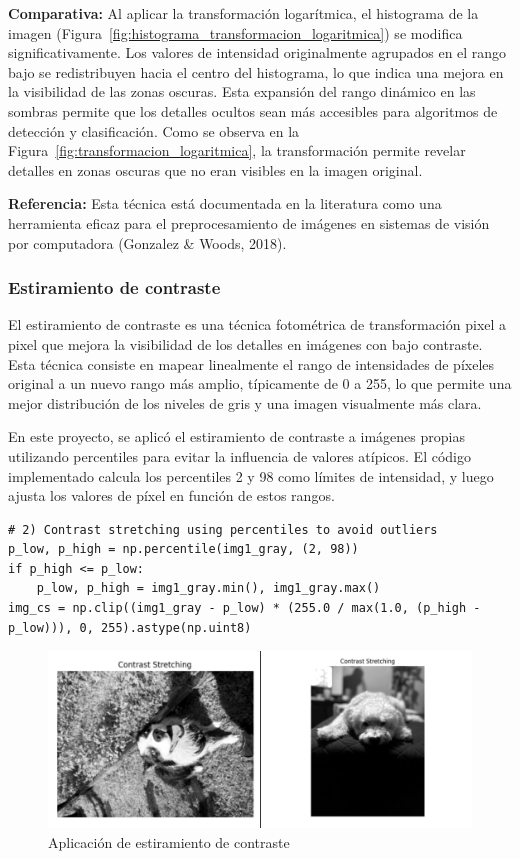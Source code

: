\documentclass[12pt,letterpaper]{article}
\begin{document}
\textbf{Comparativa:} Al aplicar la transformación logarítmica, el histograma de la imagen (Figura~\ref{fig:histograma_transformacion_logaritmica}) se modifica significativamente. Los valores de intensidad originalmente agrupados en el rango bajo se redistribuyen hacia el centro del histograma, lo que indica una mejora en la visibilidad de las zonas oscuras. Esta expansión del rango dinámico en las sombras permite que los detalles ocultos sean más accesibles para algoritmos de detección y clasificación. Como se observa en la Figura~\ref{fig:transformacion_logaritmica}, la transformación permite revelar detalles en zonas oscuras que no eran visibles en la imagen original.

\textbf{Referencia:} Esta técnica está documentada en la literatura como una herramienta eficaz para el preprocesamiento de imágenes en sistemas de visión por computadora (Gonzalez & Woods, 2018).

\subsubsection{Estiramiento de contraste}
El estiramiento de contraste es una técnica fotométrica de transformación pixel a pixel que mejora la visibilidad de los detalles en imágenes con bajo contraste. Esta técnica consiste en mapear linealmente el rango de intensidades de píxeles original a un nuevo rango más amplio, típicamente de 0 a 255, lo que permite una mejor distribución de los niveles de gris y una imagen visualmente más clara.

En este proyecto, se aplicó el estiramiento de contraste a imágenes propias utilizando percentiles para evitar la influencia de valores atípicos. El código implementado calcula los percentiles 2 y 98 como límites de intensidad, y luego ajusta los valores de píxel en función de estos rangos.

\begin{verbatim}
# 2) Contrast stretching using percentiles to avoid outliers
p_low, p_high = np.percentile(img1_gray, (2, 98))
if p_high <= p_low:
    p_low, p_high = img1_gray.min(), img1_gray.max()
img_cs = np.clip((img1_gray - p_low) * (255.0 / max(1.0, (p_high - p_low))), 0, 255).astype(np.uint8)
\end{verbatim}

\begin{figure}[H]
  \centering
  \includegraphics[width=0.8\linewidth]{figuras/estiramiento_de_contraste.png}
  \caption{Aplicación de estiramiento de contraste}
  \label{fig:estiramiento_de_contraste}
\end{figure}
\end{document}
